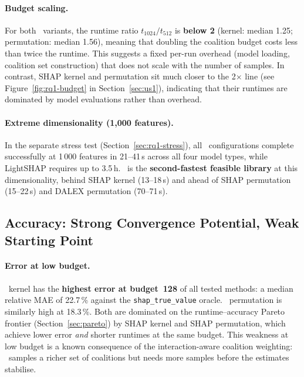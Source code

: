 \paragraph{Budget scaling.}
For both \shapiq\ variants, the runtime ratio $t_{1024}/t_{512}$ is
\textbf{below 2} (kernel: median 1.25; permutation: median 1.56), meaning
that doubling the coalition budget costs less than twice the runtime.
This suggests a fixed per-run overhead (model loading, coalition set
construction) that does not scale with the number of samples.
In contrast, SHAP kernel and permutation sit much closer to the 2$\times$
line (see Figure~\ref{fig:rq1-budget} in Section~\ref{sec:us1}), indicating
that their runtimes are dominated by model evaluations rather than overhead.

\paragraph{Extreme dimensionality (1,000 features).}
In the separate stress test (Section~\ref{sec:rq1-stress}), all \shapiq\
configurations complete successfully at 1\,000 features in 21--41\,s
across all four model types, while LightSHAP requires up to 3.5\,h.
\shapiq\ is the \textbf{second-fastest feasible library} at this
dimensionality, behind SHAP kernel (13--18\,s) and ahead of SHAP
permutation (15--22\,s) and DALEX permutation (70--71\,s).


\subsection{Accuracy: Strong Convergence Potential, Weak Starting Point}
\label{sec:shapiq-accuracy}

\paragraph{Error at low budget.}
\shapiq\ kernel has the \textbf{highest error at budget~128} of all tested
methods: a median relative MAE of 22.7\,\% against the
\texttt{shap\_true\_value} oracle.
\shapiq\ permutation is similarly high at 18.3\,\%.
Both are dominated on the runtime--accuracy Pareto frontier
(Section~\ref{sec:pareto}) by SHAP kernel and SHAP permutation, which
achieve lower error \emph{and} shorter runtimes at the same budget.
This weakness at low budget is a known consequence of the interaction-aware
coalition weighting: \shapiq\ samples a richer set of coalitions but needs
more samples before the estimates stabilise.

